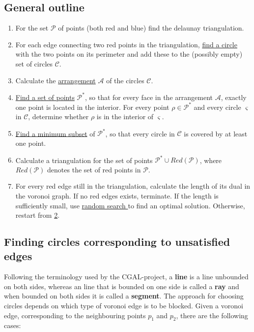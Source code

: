 \documentclass[a4paper,12pt]{article}
\begin{document}
\subsection{General outline}
\begin{enumerate}
\item
For the set $\mathcal P$ of points (both red and blue) find the delaunay triangulation.
\item
\label{alg:part2}
For each edge connecting two red points in the triangulation, \hyperref[sec:findCircle]{find a circle} with the two points on its perimeter and add these to the (possibly empty) set of circles $\mathcal C$.
\item
Calculate the \hyperref[sec:arrangement]{arrangement} $\mathcal A$ of the circles $\mathcal C$.
\item
\hyperref[sec:findPoints]{Find a set of points} $\mathcal P^*$, so that for every face in the arrangement $\mathcal A$, exactly one point is located in the interior. For every point $\rho  \in \mathcal P^*$ and every circle $\varsigma$ in $\mathcal C$, determine whether $\rho$ is in the interior of $\varsigma$.
\item
\hyperref[sec:gurobi]{Find a minimum subset} of $\mathcal P^*$, so that every circle in $\mathcal C$ is covered by at least one point.
\item
Calculate a triangulation for the set of points $\mathcal P^* \cup Red(\mathcal P )$, where  $Red(\mathcal P )$ denotes the set of red points in $\mathcal P$.
\item
For every red edge still in the triangulation, calculate the length of its dual in the voronoi graph. If no red edges exists, terminate. If the length is sufficiently small, use \hyperref[sec:rand]{random search } to find an optimal solution. Otherwise, restart from \hyperref[alg:part2]{2}.
\end{enumerate}

\subsection{Finding circles corresponding to unsatisfied edges}
\label{sec:findCircle}
Following the terminology used by the CGAL-project, a {\bf line} is a line unbounded on both sides, whereas an line that is bounded on one side is called a {\bf ray} and when bounded on both sides it is called a {\bf segment}. The approach for choosing circles depends on which type of voronoi edge is to be blocked. Given a voronoi edge, corresponding to the neighbouring points $p_1$ and $p_2$, there are the following cases:
\end{document}
